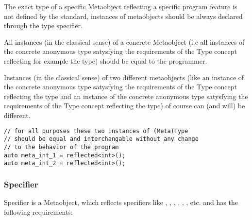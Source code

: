 The exact type of a specific {\metaobject Metaobject} reflecting a specific
program feature is not defined by the standard, instances of metaobjects
should be always declared through the \verb@auto@ type specifier.

All instances (in the classical sense) of a concrete {\metaobject Metaobject} (i.e all instances 
of the concrete anonymous type satysfying the requirements of the {\metaobject Type} concept
reflecting for example the \verb@int@ type) should be equal to
the programmer.

Instances (in the classical sense) of two different metaobjects (like an instance
of the concrete anonymous type satysfying the requirements of the {\metaobject Type} concept
reflecting the \verb@int@ type and an instance 
of the concrete anonymous type satysfying the requirements of the {\metaobject Type} concept
reflecting the \verb@double@ type) of course can (and will) be different.

\begin{lstlisting}
// for all purposes these two instances of (Meta)Type
// should be equal and interchangable without any change
// to the behavior of the program
auto meta_int_1 = reflected<int>();
auto meta_int_2 = reflected<int>();
\end{lstlisting}

\subsubsection{Specifier}

{\metaobject Specifier} is a {\metaobject Metaobject}, which reflects specifiers like
\verb@const@, \verb@volatile@, \verb@private@,
\verb@protected@, \verb@public@, \verb@virtual@, etc. and has the following
requirements:

